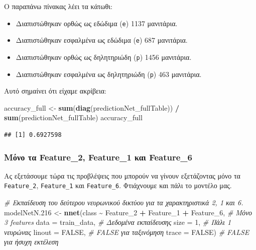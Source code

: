 \documentclass[
]{article}
\newenvironment{Shaded}{\begin{snugshade}}{\end{snugshade}}
\newcommand{\AttributeTok}[1]{\textcolor[rgb]{0.13,0.29,0.53}{#1}}
\newcommand{\CommentTok}[1]{\textcolor[rgb]{0.56,0.35,0.01}{\textit{#1}}}
\newcommand{\ConstantTok}[1]{\textcolor[rgb]{0.56,0.35,0.01}{#1}}
\newcommand{\DecValTok}[1]{\textcolor[rgb]{0.00,0.00,0.81}{#1}}
\newcommand{\FloatTok}[1]{\textcolor[rgb]{0.00,0.00,0.81}{#1}}
\newcommand{\FunctionTok}[1]{\textcolor[rgb]{0.13,0.29,0.53}{\textbf{#1}}}
\newcommand{\NormalTok}[1]{#1}
\newcommand{\OtherTok}[1]{\textcolor[rgb]{0.56,0.35,0.01}{#1}}
\newcommand{\SpecialCharTok}[1]{\textcolor[rgb]{0.81,0.36,0.00}{\textbf{#1}}}
\begin{document}
Ο παραπάνω πίνακας λέει τα κάτωθι:

\begin{itemize}
\item
  Διαπιστώθηκαν ορθώς ως εδώδιμα (\texttt{e}) 1137 μανιτάρια.
\item
  Διαπιστώθηκαν εσφαλμένα ως εδώδιμα (\texttt{e}) 687 μανιτάρια.
\item
  Διαπιστώθηκαν ορθώς ως δηλητηριώδη (\texttt{p}) 1456 μανιτάρια.
\item
  Διαπιστώθηκαν εσφαλμένα ως δηλητηριώδη (\texttt{p}) 463 μανιτάρια.
\end{itemize}

Αυτό σημαίνει ότι είχαμε ακρίβεια:

\begin{Shaded}
\begin{Highlighting}[]
\NormalTok{accuracy\_full }\OtherTok{\textless{}{-}} \FunctionTok{sum}\NormalTok{(}\FunctionTok{diag}\NormalTok{(predictionNet\_fullTable)) }\SpecialCharTok{/} \FunctionTok{sum}\NormalTok{(predictionNet\_fullTable)}
\NormalTok{accuracy\_full}
\end{Highlighting}
\end{Shaded}

\begin{verbatim}
## [1] 0.6927598
\end{verbatim}

\subsubsection{Μόνο τα Feature\_2, Feature\_1 και
Feature\_6}\label{ux3bcux3ccux3bdux3bf-ux3c4ux3b1-feature_2-feature_1-ux3baux3b1ux3b9-feature_6}

Ας εξετάσουμε τώρα τις προβλέψεις που μπορούν να γίνουν εξετάζοντας μόνο
τα \texttt{Feature\_2}, \texttt{Feature\_1} και \texttt{Feature\_6}.
Φτιάχνουμε και πάλι το μοντέλο μας.

\begin{Shaded}
\begin{Highlighting}[]
\CommentTok{\# Εκπαίδευση του δεύτερου νευρωνικού δικτύου για τα χαρακτηριστικά 2, 1 και 6.}
\NormalTok{modelNetN}\FloatTok{.216} \OtherTok{\textless{}{-}} \FunctionTok{nnet}\NormalTok{(class }\SpecialCharTok{\textasciitilde{}}\NormalTok{ Feature\_2 }\SpecialCharTok{+}\NormalTok{ Feature\_1 }\SpecialCharTok{+}\NormalTok{ Feature\_6,  }\CommentTok{\# Μόνο 3 features}
               \AttributeTok{data =}\NormalTok{ train\_data,  }\CommentTok{\# Δεδομένα εκπαίδευσης}
               \AttributeTok{size =} \DecValTok{1}\NormalTok{,  }\CommentTok{\# Πάλι 1 νευρώνας}
               \AttributeTok{linout =} \ConstantTok{FALSE}\NormalTok{,  }\CommentTok{\# FALSE για ταξινόμηση}
               \AttributeTok{trace =} \ConstantTok{FALSE}\NormalTok{)  }\CommentTok{\# FALSE για ήσυχη εκτέλεση}
\end{Highlighting}
\end{Shaded}
\end{document}
